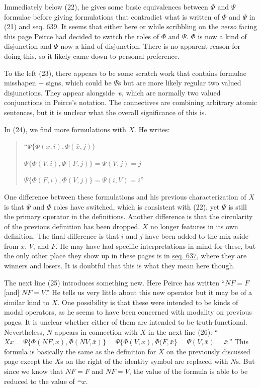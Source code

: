 Immediately below (22), he gives some basic equivalences between $\Phi$ and $\Psi$ formulae before giving formulations that contradict what is written of $\Phi$ and $\Psi$ in (21) and seq. 639. It seems that either here or while scribbling on the \textit{verso} facing this page Peirce had decided to switch the roles of $\Phi$ and $\Psi$. $\Phi$ is now a kind of disjunction and $\Psi$ now a kind of disjunction. There is no apparent reason for doing this, so it likely came down to personal preference.

To the left (23), there appears to be some scratch work that contains formulae misshapen $+$ signs, which could be $\Psi$s but are more likely regular two valued disjunctions. They appear alongside $\cdot$s, which are normally two valued conjunctions in Peirce's notation. The connectives are combining arbitrary atomic sentences, but it is unclear what the overall significance of this is.

In (24), we find more formulations with $X$. He writes:
\begin{quotation}
``$\Psi\{\Phi(x, i),\Phi(\bar{x}, j)\}$

$\Psi\{\Phi(V, i),\Phi(F, j)\}=\Psi(V,j)=j$

$\Psi\{\Phi(F, i),\Phi(V, j)\}=\Psi(i,V)=i$''
\end{quotation}
\noindent One difference between these formulations and his previous characterization of $X$ is that $\Psi$ and $\Phi$ roles have switched, which is consistent with (22), yet $\Psi$ is still the primary operator in the definitions. Another difference is that the circularity of the previous definition has been dropped. $X$ no longer features in its own definition. The final difference is that $i$ and $j$ have been added to the mix aside from $x$, $V$, and $F$. He may have had specific interpretations in mind for these, but the only other place they show up in these pages is in \href{https://iiif.lib.harvard.edu/manifests/view/drs:15255301$637i}{seq. 637}, where they are winners and losers. It is doubtful that this is what they mean here though.

The next line (25) introduces something new. Here Peirce has written ``$NF=F$ [and] $NF=V$.'' He tells us very little about this new operator but it may be of a similar kind to $X$. One possibility is that these were intended to be kinds of modal operators, as he seems to have been concerned with modality on previous pages. It is unclear whether either of them are intended to be truth-functional. Nevertheless, $N$ appears in connection with $X$ in the next line (26): ``$Xx=\Psi\{\Phi(NF, x), \Phi(NV, \bar{x})\}=\Psi\{\Phi(V,x),\Phi(F,\bar{x}\}=\Psi(V,\bar{x})=\bar{x} $.'' This formula is basically the same as the definition for $X$ on the previously discussed page except the $X$s on the right of the identity symbol are replaced with $N$s. But since we know that $NF=F$ and $NF=V$, the value of the formula is able to be reduced to the value of $\bar{\lnot}x$. 

